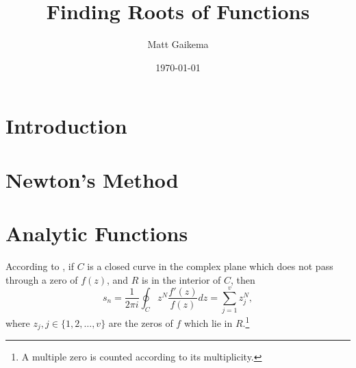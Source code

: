 \documentclass{article}
\title{Finding Roots of Functions}
\author{Matt Gaikema}
\date{\today}
\begin{document}
\maketitle

\section{Introduction}

\section{Newton's Method}

\section{Analytic Functions}

According to \cite{delves1967numerical},
if $C$ is a closed curve in the complex plane which does not pass through a zero of $f(z)$, and $R$ is in the interior of $C$, 
then
\begin{equation}
	s_n=\frac{1}{2\pi i}\oint_Cz^N\frac{f'(z)}{f(z)}dz=\sum_{j=1}^vz_j^N,
\end{equation}
where $z_j,j\in\{1,2,\dots,v\}$ are the zeros of $f$ which lie in $R$.\footnote{A multiple zero is counted according to its multiplicity.}

\printbibliography
\end{document}
